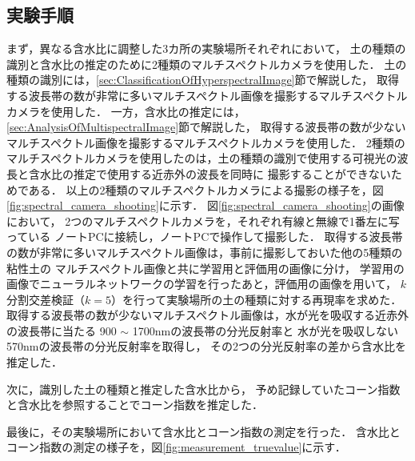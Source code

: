 \subsection{実験手順}
\label{ssec:ConeindexEstimationExperimentProcedure}

まず，異なる含水比に調整した3カ所の実験場所それぞれにおいて，
土の種類の識別と含水比の推定のために2種類のマルチスペクトルカメラを使用した．
土の種類の識別には，\ref{sec:ClassificationOfHyperspectralImage}節で解説した，
取得する波長帯の数が非常に多いマルチスペクトル画像を撮影するマルチスペクトルカメラを使用した．
一方，含水比の推定には，\ref{sec:AnalysisOfMultispectralImage}節で解説した，
取得する波長帯の数が少ないマルチスペクトル画像を撮影するマルチスペクトルカメラを使用した．
2種類のマルチスペクトルカメラを使用したのは，土の種類の識別で使用する可視光の波長と含水比の推定で使用する近赤外の波長を同時に
撮影することができないためである．
以上の2種類のマルチスペクトルカメラによる撮影の様子を，図\ref{fig:spectral_camera_shooting}に示す．
図\ref{fig:spectral_camera_shooting}の画像において，
2つのマルチスペクトルカメラを，それぞれ有線と無線で1番左に写っている
ノートPCに接続し，ノートPCで操作して撮影した．
取得する波長帯の数が非常に多いマルチスペクトル画像は，事前に撮影しておいた他の5種類の粘性土の
マルチスペクトル画像と共に学習用と評価用の画像に分け，
学習用の画像でニューラルネットワークの学習を行ったあと，評価用の画像を用いて，
$k$分割交差検証（$k=5$）を行って実験場所の土の種類に対する再現率を求めた．
取得する波長帯の数が少ないマルチスペクトル画像は，水が光を吸収する近赤外の波長帯に当たる
900 $\sim$ 1700nmの波長帯の分光反射率と
水が光を吸収しない570nmの波長帯の分光反射率を取得し，
その2つの分光反射率の差から含水比を推定した．

次に，識別した土の種類と推定した含水比から，
予め記録していたコーン指数と含水比を参照することでコーン指数を推定した．

最後に，その実験場所において含水比とコーン指数の測定を行った．
含水比とコーン指数の測定の様子を，図\ref{fig:measurement_truevalue}に示す．

